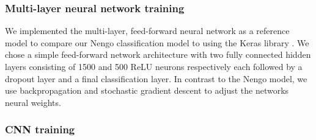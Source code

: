 \subsubsection{Multi-layer neural network training}%
\label{ssubsec:multi_layer_neural_network_training}

We implemented the multi-layer, feed-forward neural network as a reference model to compare our \ac{Nengo} classification model to using the Keras library \parencite{Chollet2015keras}.
We chose a simple feed-forward network architecture with two fully connected hidden layers consisting of \num{1500} and \num{500} \ac{ReLU} neurons respectively each followed by a dropout layer and a final classification layer.
In contrast to the \ac{Nengo} model, we use backpropagation and stochastic gradient descent to adjust the networks neural weights.

\subsubsection{\acs{CNN} training}%
\label{ssubsec:cnn_training}


